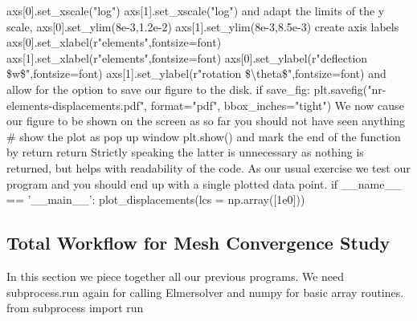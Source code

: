 \ttbegin
    axs[0].set_xscale("log")
    axs[1].set_xscale("log")
\ttend 
and adapt the limits of the y scale,
\ttbegin
    axs[0].set_ylim(8e-3,1.2e-2)
    axs[1].set_ylim(8e-3,8.5e-3)
\ttend 
create axis labels
\ttbegin
    axs[0].set_xlabel(r"elements",fontsize=font)
    axs[1].set_xlabel(r"elements",fontsize=font)
    axs[0].set_ylabel(r"deflection \$w\$",fontsize=font)
    axs[1].set_ylabel(r"rotation \$\textbackslash theta\$",fontsize=font)
\ttend 
and allow for the option to save our figure to the disk.
\ttbegin
    if save\_fig:
        plt.savefig("nr-elements-displacements.pdf", format="pdf",
                    bbox_inches="tight")
\ttend 
We now cause our figure to be shown on the screen as so far you should not have seen anything
\ttbegin
    # show the plot as pop up window
    plt.show()
\ttend 
and mark the end of the function by return
\ttbegin
    return 
\ttend 
Strictly speaking the latter is unnecessary as nothing is returned, but helps with readability of the code. As our usual exercise we test our program and you should end up with a single plotted data point.
\ttbegin
if __name__ == '__main__':
    plot_displacements(lcs = np.array([1e0]))
\ttend
\subsection*{Total Workflow for Mesh Convergence Study}
In this section we piece together all our previous programs. We need subprocess.run again for calling Elmersolver and numpy for basic array routines.
\ttbegin
from subprocess import run

